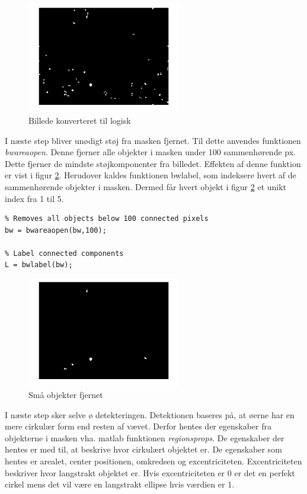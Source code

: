 \begin{figure}[H]
	\centering
	\includegraphics[width=0.6\textwidth]{billeder/software/im2bw.png}
	\caption{Billede konverteret til logisk}
	\label{fig:im2bw}
\end{figure}

I næste step bliver unødigt støj fra masken fjernet. Til dette anvendes funktionen \textit{bwareaopen}. Denne fjerner alle objekter i masken under 100 sammenhørende px. Dette fjerner de mindste støjkomponenter fra billedet. Effekten af denne funktion er vist i figur \ref{fig:bwarea}. Herudover kaldes funktionen bwlabel, som indeksere hvert af de sammenhørende objekter i masken. Dermed får hvert objekt i figur \ref{fig:bwarea} et unikt index fra 1 til 5. 
\begin{lstlisting} 
% Removes all objects below 100 connected pixels
bw = bwareaopen(bw,100);

% Label connected components
L = bwlabel(bw);
\end{lstlisting} 

\begin{figure}[H]
	\centering
	\includegraphics[width=0.6\textwidth]{billeder/software/bwarea.png}
	\caption{Små objekter fjernet}
	\label{fig:bwarea}
\end{figure}

I næste step sker selve ø detekteringen. Detektionen baseres på, at øerne har en mere cirkulær form end resten af vævet. Derfor hentes der egenskaber fra objekterne i masken vha. matlab funktionen \textit{regionsprops}. De egenskaber der hentes er med til, at beskrive hvor cirkulært objektet er. De egenskaber som hentes er arealet, center positionen, omkredsen og excentriciteten. Excentriciteten beskriver hvor langstrakt objektet er. Hvis excentriciteten er 0 er det en perfekt cirkel mens det vil være en langstrakt ellipse hvis værdien er 1.

